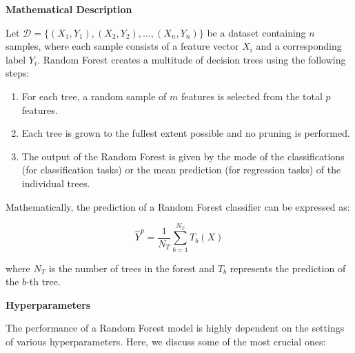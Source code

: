 \documentclass[twocolumn]{article}
\begin{document}
\textbf{\large Mathematical Description}

Let \( \mathcal{D} = \{(X_1, Y_1), (X_2, Y_2), \dots, (X_n, Y_n)\} \) be a dataset containing \( n \) samples, where each sample consists of a feature vector \( X_i \) and a corresponding label \( Y_i \). Random Forest creates a multitude of decision trees using the following steps:

\begin{enumerate}
    \item For each tree, a random sample of \( m \) features is selected from the total \( p \) features.
    \item Each tree is grown to the fullest extent possible and no pruning is performed.
    \item The output of the Random Forest is given by the mode of the classifications (for classification tasks) or the mean prediction (for regression tasks) of the individual trees.
\end{enumerate}

Mathematically, the prediction of a Random Forest classifier can be expressed as:

\begin{equation}
    \hat{Y}^p = \frac{1}{N_T} \sum_{b=1}^{N_T} T_b(X)
\end{equation}

where \( N_T \) is the number of trees in the forest and \( T_b \) represents the prediction of the \( b \)-th tree.

\textbf{\large Hyperparameters}

The performance of a Random Forest model is highly dependent on the settings of various hyperparameters. Here, we discuss some of the most crucial ones:
\end{document}
